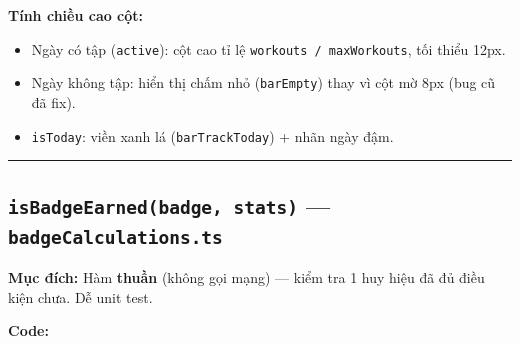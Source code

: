 \documentclass[12pt,a4paper]{article}
\newenvironment{Shaded}{%
  \VerbatimEnvironment
  \begin{quote}\small\ttfamily
}{%
  \end{quote}%
}
\providecommand{\tightlist}{%
  \setlength{\itemsep}{0pt}\setlength{\parskip}{0pt}}
\begin{document}
\textbf{Tính chiều cao cột:}

\begin{Shaded}
\begin{Highlighting}[]
\OperatorTok{=}
   \NormalTok{(}\OperatorTok{,} \OperatorTok{/}\OperatorTok{*}
  \OperatorTok{:} \OperatorTok{;}

\end{Highlighting}
\end{Shaded}

\begin{itemize}
\tightlist
\item
  Ngày có tập (\texttt{active}): cột cao tỉ lệ
  \texttt{workouts\ /\ maxWorkouts}, tối thiểu 12px.
\item
  Ngày không tập: hiển thị chấm nhỏ (\texttt{barEmpty}) thay vì cột mờ
  8px (bug cũ đã fix).
\item
  \texttt{isToday}: viền xanh lá (\texttt{barTrackToday}) + nhãn ngày
  đậm.
\end{itemize}

\begin{center}\rule{0.5\linewidth}{0.5pt}\end{center}

\subsection{\texorpdfstring{\texttt{isBadgeEarned(badge,\ stats)} ---
\texttt{badgeCalculations.ts}}{isBadgeEarned(badge, stats) --- badgeCalculations.ts}}\label{isbadgeearnedbadge-stats-badgecalculations.ts}

\textbf{Mục đích:} Hàm \textbf{thuần} (không gọi mạng) --- kiểm tra 1
huy hiệu đã đủ điều kiện chưa. Dễ unit test.

\textbf{Code:}
\end{document}
